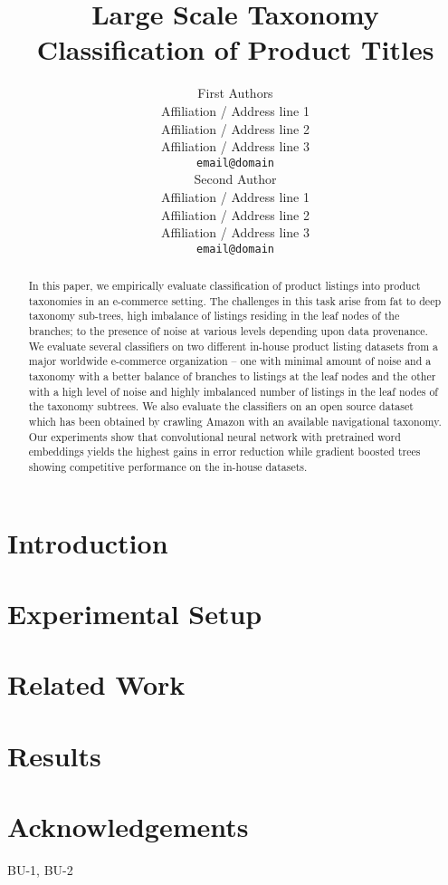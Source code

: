\documentclass[11pt]{article}
\title{Large Scale Taxonomy Classification of Product Titles}
\author{First Authors \\
  Affiliation / Address line 1 \\
  Affiliation / Address line 2 \\
  Affiliation / Address line 3 \\
  {\tt email@domain} \\\And
  Second Author \\
  Affiliation / Address line 1 \\
  Affiliation / Address line 2 \\
  Affiliation / Address line 3 \\
  {\tt email@domain} \\}
\date{}
\begin{document}
\maketitle
\begin{abstract}
In this paper, we empirically evaluate classification of product listings into product taxonomies in an e-commerce setting.
The challenges in this task arise from fat to deep taxonomy sub-trees, high imbalance of listings residing in the leaf nodes of the branches; to the presence of noise at various levels depending upon data provenance.
We evaluate several classifiers on two different in-house product listing datasets from a major worldwide e-commerce organization -- 
one with minimal amount of noise and a taxonomy with a better balance of branches to listings at the leaf nodes and the other with a high level of noise and highly imbalanced number of listings in the leaf nodes of the taxonomy subtrees. 
We also evaluate the classifiers on an open source dataset which has been obtained by crawling Amazon with an available navigational taxonomy. 
Our experiments show that convolutional neural network with pretrained word embeddings yields the highest gains in error reduction while gradient boosted trees showing competitive performance on the in-house datasets.

\end{abstract}

\section{Introduction}
\label{Sect:intro}

\section{Experimental Setup}
\label{Sect:experimental_setup}



\section{Related Work}
\label{Sect:related}



\section{Results}
\label{Sect:results}




\section{Acknowledgements}
\label{Sect:aknowledgement}


BU-1, BU-2



\end{document}
